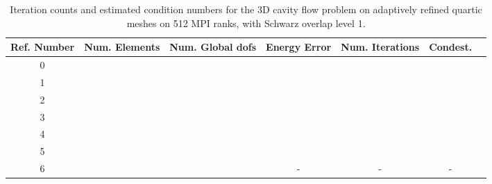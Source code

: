 \documentclass[11pt]{amsart}
\begin{document}
\begin{table}
\begin{tabular}{ c  c  c  c  c  c c}
Ref. Number	&Num. Elements	& Num. Global dofs		&Energy Error	&Num. Iterations	&Condest.\\
\hline
0	&	&	&	&&\\
1	&	&	&	&&\\
2	&	&	&	&	&\\
3	&	&	&	&	&\\
4	&	&	&	&	&\\
5	&	&	&	&	&\\
6	&	&	&-	&-	&-\\
\end{tabular}
\caption{Iteration counts and estimated condition numbers for the 3D cavity flow problem on adaptively refined quartic meshes on 512 MPI ranks, with Schwarz overlap level 1.}
\label{table:stokesConditioningStudyAdaptiveMeshes3DQuarticOverlap1}
\end{table}
\end{document}
